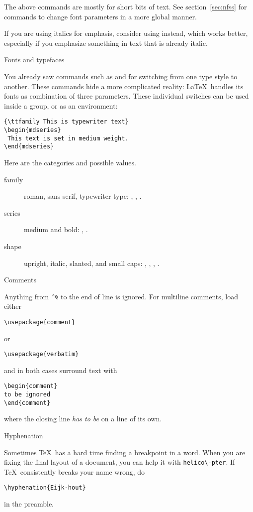 The above commands are mostly for short bits of text. See
section~\ref{sec:nfss} for commands to change font parameters in a
more global manner.

If you are using italics for emphasis, consider using 
instead, which works better, especially if you emphasize something
in text that is already italic.

 {Fonts and typefaces}
\label{sec:nfss}

You already saw commands such as  and  for
switching from one type style to another. These commands hide a more
complicated reality: \LaTeX\ handles its fonts as combination of
three parameters. These individual switches can be used inside a group,
or as an environment:
\begin{verbatim}
{\ttfamily This is typewriter text}
\begin{mdseries}
 This text is set in medium weight.
\end{mdseries}
\end{verbatim}
Here are the categories and possible values.
\begin{description}
\item[family] roman, sans serif, typewriter type: ,
  , .
\item[series] medium and bold: , .
\item[shape] upright, italic, slanted, and small caps:
  , , ,
  .
\end{description}

 {Comments}

Anything from {\tt\char`\%} to the end of line is ignored. For
multiline comments, load either
\begin{verbatim}
\usepackage{comment}
\end{verbatim}
or
\begin{verbatim}
\usepackage{verbatim}
\end{verbatim}
and in both cases surround text with
\begin{verbatim}
\begin{comment}
to be ignored
\end{comment}
\end{verbatim}
where the closing line {\em has to be} on a line of its own.

 {Hyphenation}
\label{sec:hyphen}

Sometimes \TeX\ has a hard time finding a breakpoint in a word. When
you are fixing the final layout of a document, you can help it with
\verb+helico\-pter+. If \TeX\ consistently breaks your name wrong, do
\begin{verbatim}
\hyphenation{Eijk-hout}
\end{verbatim}
in the preamble.

